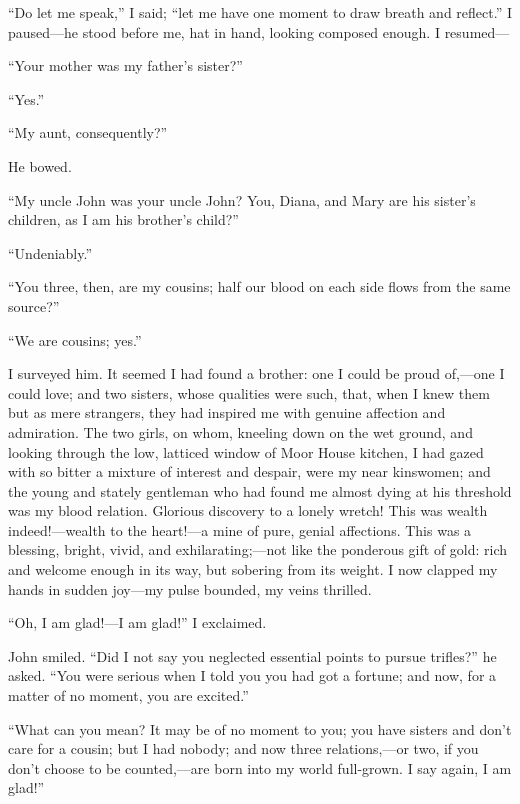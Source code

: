 \enquote{Do let me speak,} I said; \enquote{let me have one moment to
	draw breath and reflect.} I paused---he stood before me, hat in hand,
looking composed enough. I resumed---

\enquote{Your mother was my father's sister?}

\enquote{Yes.}

\enquote{My aunt, consequently?}

He bowed.

\enquote{My uncle John was your uncle John? You, Diana, and Mary are
	his sister's children, as I am his brother's child?}

\enquote{Undeniably.}

\enquote{You three, then, are my cousins; half our blood on each side
	flows from the same source?}

\enquote{We are cousins; yes.}

I surveyed him. It seemed I had found a brother: one I could be proud
of,---one I could love; and two sisters, whose qualities were such,
that, when I knew them but as mere strangers, they had inspired me with
genuine affection and admiration. The two girls, on whom, kneeling down
on the wet ground, and looking through the low, latticed window of Moor
House kitchen, I had gazed with so bitter a mixture of interest and
despair, were my near kinswomen; and the young and stately gentleman who
had found me almost dying at his threshold was my blood relation.
Glorious discovery to a lonely wretch! This was wealth indeed!---wealth
to the heart!---a mine of pure, genial affections. This was a blessing,
bright, vivid, and exhilarating;---not like the ponderous gift of gold:
rich and welcome enough in its way, but sobering from its weight. I now
clapped my hands in sudden joy---my pulse bounded, my veins thrilled.

\enquote{Oh, I am glad!---I am glad!} I exclaimed.

\St{} John smiled. \enquote{Did I not say you neglected essential points
	to pursue trifles?} he asked. \enquote{You were serious when I told you
	you had got a fortune; and now, for a matter of no moment, you are
	excited.}

\enquote{What can you mean? It may be of no moment to you; you have
	sisters and don't care for a cousin; but I had nobody; and now three
	relations,---or two, if you don't choose to be counted,---are born into
	my world full-grown. I say again, I am glad!}

